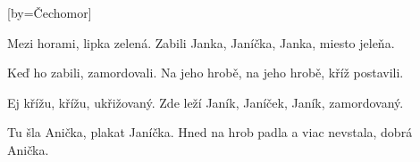 [by={Čechomor}]

\beginverse{}
\lrep{} Mezi horami, lipka zelená. \rrep{}
\lrep{} Zabili Janka, Janíčka, Janka, miesto jeleňa. \rrep{}
\endverse{}

\beginverse{}
\lrep{} Keď ho zabili, zamordovali. \rrep{}
\lrep{} Na jeho hrobě, na jeho hrobě, kříž postavili. \rrep{}
\endverse{}

\beginverse{}
\lrep{} Ej křížu, křížu, ukřižovaný. \rrep{}
\lrep{} Zde leží Janík, Janíček, Janík, zamordovaný. \rrep{}
\endverse{}

\beginverse{}
\lrep{} Tu šla Anička, plakat Janíčka. \rrep{}
\lrep{} Hned na hrob padla a viac nevstala, dobrá Anička. \rrep{}
\endverse{}

\endsong{}
